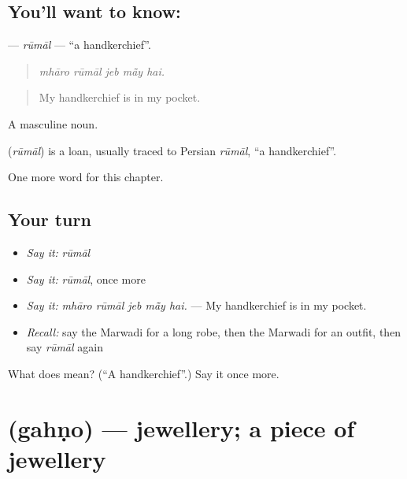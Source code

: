 \subsection*{You'll want to know: }
\textbf{} — \emph{rūmāl} — \textquotedblleft{}a handkerchief\textquotedblright{}.

\begin{quote}
    
\end{quote}

\begin{quote}
\emph{mhāro rūmāl jeb mā̃y hai.}
\end{quote}

\begin{quote}
My handkerchief is in my pocket.
\end{quote}

A masculine noun.

\begin{cousinweb}
\textbf{} (\emph{rūmāl}) is a loan, usually traced to Persian \emph{rūmāl}, \textquotedblleft{}a handkerchief\textquotedblright{}.
\end{cousinweb}

\begin{grammarlens}[title={What you've built}]
One more word for this chapter.
\end{grammarlens}

\subsection*{Your turn}
\begin{itemize}
\raggedright
  \item \emph{Say it:} \emph{rūmāl}
  \item \emph{Say it:} \emph{rūmāl}, once more
  \item \emph{Say it:} \emph{mhāro rūmāl jeb mā̃y hai.} — My handkerchief is in my pocket.
  \item \emph{Recall:} say the Marwadi for a long robe, then the Marwadi for an outfit, then say \emph{rūmāl} again
\end{itemize}

\begin{tcolorbox}[breakable,colback=teal!4,colframe=teal!35!black,title={Before you move on}]
What does  mean? (\textquotedblleft{}A handkerchief\textquotedblright{}.) Say it once more.
\end{tcolorbox}
\section[\texorpdfstring{\mw{गहणो} (gahṇo)}{गहणो (gahṇo)}]{ (gahṇo) — jewellery; a piece of jewellery}

